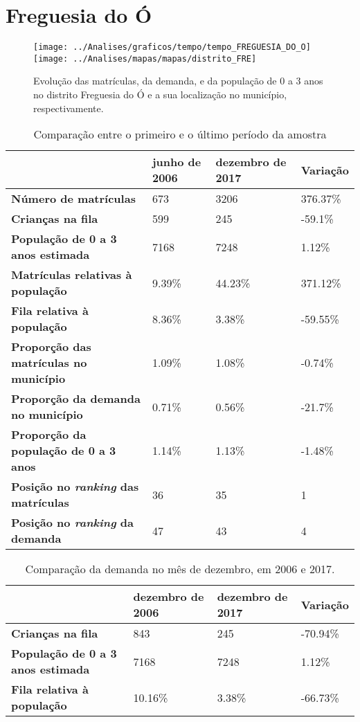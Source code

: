 \section{Freguesia do Ó}
\begin{figure}[H]
\centering
\texttt{[image: ../Analises/graficos/tempo/tempo\_FREGUESIA\_DO\_O]}
\texttt{[image: ../Analises/mapas/mapas/distrito\_FRE]}
\caption{Evolução das matrículas, da demanda, e da população de 0 a 3 anos no distrito Freguesia do Ó e a sua localização no município, respectivamente.}
\end{figure}
\begin{table}[H]
\begin{tabular}{l|l|l|l}
\textbf{}                                      & \textbf{junho de 2006}       & \textbf{dezembro de 2017}    & \textbf{Variação} \\ \hline
\textbf{Número de matrículas}                  & 673 & 3206 & 376.37\% \\ \hline
\textbf{Crianças na fila}                      & 599 & 245 & -59.1\% \\ \hline
\textbf{População de 0 a 3 anos estimada}      & 7168 & 7248 & 1.12\% \\ \hline
\textbf{Matrículas relativas à população}      & 9.39\% & 44.23\% & 371.12\% \\ \hline
\textbf{Fila relativa à população}             & 8.36\% & 3.38\% & -59.55\% \\ \hline
\textbf{Proporção das matrículas no município} & 1.09\% & 1.08\% & -0.74\% \\ \hline
\textbf{Proporção da demanda no município}     & 0.71\% & 0.56\% & -21.7\% \\ \hline
\textbf{Proporção da população de 0 a 3 anos}  & 1.14\% & 1.13\% & -1.48\% \\ \hline
\textbf{Posição no \textit{ranking} das matrículas}     & 36 & 35 & 1 \\ \hline
\textbf{Posição no \textit{ranking} da demanda}         & 47 & 43 & 4 \\ 
\end{tabular}
\caption{Comparação entre o primeiro e o último período da amostra}
\end{table}
\begin{table}[H]
\begin{tabular}{l|l|l|l}
\textbf{}                                 & \textbf{dezembro de 2006} & \textbf{dezembro de 2017} & \textbf{Variação} \\ \hline
\textbf{Crianças na fila}                      & 843 & 245 & -70.94\% \\ \hline
\textbf{População de 0 a 3 anos estimada}      & 7168 & 7248 & 1.12\% \\ \hline
\textbf{Fila relativa à população}             & 10.16\% & 3.38\% & -66.73\% \\
\end{tabular}
\caption{Comparação da demanda no mês de dezembro, em 2006 e 2017.}
\end{table}
